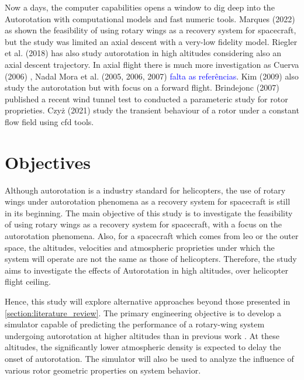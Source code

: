 Now a days, the computer capabilities opens a window to dig deep into the Autorotation with computational models and fast numeric tools. Marques (2022) \cite{marques_design_2024} as shown the feasibility of using rotary wings as a recovery system for spacecraft, but the study was limited an axial descent with a very-low fidelity model. Riegler et al. (2018) \cite{riegler_daedalus_2018} has also study autorotation in high altitudes considering also an axial descent trajectory. In axial flight there is much more investigation as Cuerva (2006) \cite{cuerva_engineering_2006} , Nadal Mora et al. (2005, 2006, 2007) \textcolor{blue}{falta as referências}. Kim (2009) \cite{kim_v_2009} also study the autorotation but with focus on a forward flight. Brindejonc (2007) \cite{brindejonc_design_2007} published a recent wind tunnel test to conducted a parameteric study for rotor proprieties. Czyż (2021) \cite{czyz_v_2021} study the transient behaviour of a rotor under a constant flow field using \gls{cfd} tools.

\section{Objectives}
\label{section:objectives}

Although autorotation is a industry standard for helicopters, the use of rotary wings under autorotation phenomena as a recovery system for spacecraft is still in its beginning. The main objective of this study is to investigate the feasibility of using rotary wings as a recovery system for spacecraft, with a focus on the autorotation phenomena. Also, for a spacecraft which comes from \gls{leo} or the outer space, the altitudes, velocities and atmospheric proprieties under which the system will operate are not the same as those of helicopters. Therefore, the study aims to investigate the effects of Autorotation in high altitudes, over helicopter flight ceiling.

Hence, this study will explore alternative approaches beyond those presented in \ref{section:literature_review}. The primary engineering objective is to develop a simulator capable of predicting the performance of a rotary-wing system undergoing autorotation at higher altitudes than in previous work \cite{marques_design_2024}. At these altitudes, the significantly lower atmospheric density is expected to delay the onset of autorotation. The simulator will also be used to analyze the influence of various rotor geometric properties on system behavior. 

